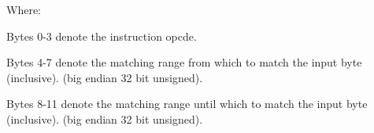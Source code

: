 Where:

Bytes 0-3 denote the instruction opcde.

Bytes 4-7 denote the matching range
from which to match the input byte (inclusive).
(big endian 32 bit unsigned).

Bytes 8-11 denote the matching range
until which to match the input byte (inclusive).
(big endian 32 bit unsigned).
